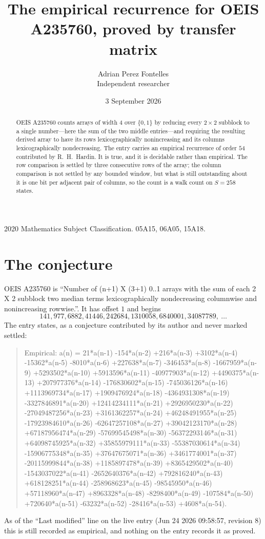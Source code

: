 \documentclass[11pt,a4paper]{article}
\title{The empirical recurrence for OEIS A235760, proved by transfer matrix}
\author{Adrian Perez Fontelles\\ \small Independent researcher}
\date{3 September 2026}
\theoremstyle{plain}
\theoremstyle{definition}
\begin{document}
\maketitle

\begin{abstract}
OEIS A235760 counts arrays of width $4$ over $\{0,1\}$ by reducing every $2\times2$ subblock to a
single number---here the sum of the two middle entries---and requiring the resulting derived array to have its rows
lexicographically nonincreasing and its columns lexicographically nondecreasing. The entry carries an
empirical recurrence of order $54$ contributed by R.~H.~Hardin. It is true, and it is
decidable rather than empirical. The row comparison is settled by three consecutive rows of the
array; the column comparison is not settled by any bounded window, but what is still outstanding
about it is one bit per adjacent pair of columns, so the count is a walk count on $S=258$
states.
\end{abstract}

\noindent\small 2020 Mathematics Subject Classification. 05A15, 06A05, 15A18.\normalsize

\section{The conjecture}

OEIS A235760 is ``Number of (n+1) X (3+1) 0..1 arrays with the sum of each 2 X 2 subblock two median terms lexicographically nondecreasing columnwise and nonincreasing rowwise.''. It has offset $1$ and begins
\[
141, 977, 6882, 41446, 242684, 1310058, 6840001, 34087789,\ \dots
\]
The entry states, as a conjecture contributed by its author and never marked settled:
\begin{quote}
Empirical: a(n) = 21*a(n-1) -154*a(n-2) +216*a(n-3) +3102*a(n-4) -15362*a(n-5) -8010*a(n-6) +227638*a(n-7) -346453*a(n-8) -1667959*a(n-9) +5293502*a(n-10) +5913596*a(n-11) -40977903*a(n-12) +4490375*a(n-13) +207977376*a(n-14) -176830602*a(n-15) -745036126*a(n-16) +1113969734*a(n-17) +1909476924*a(n-18) -4364931308*a(n-19) -3327846891*a(n-20) +12414234111*a(n-21) +2926950230*a(n-22) -27049487256*a(n-23) +3161362257*a(n-24) +46248491955*a(n-25) -17923984610*a(n-26) -62647257108*a(n-27) +39042123170*a(n-28) +67187956474*a(n-29) -57699545498*a(n-30) -56372293146*a(n-31) +64098745925*a(n-32) +35855979111*a(n-33) -55387030614*a(n-34) -15906775348*a(n-35) +37647675071*a(n-36) +3461774001*a(n-37) -20115999844*a(n-38) +1185897478*a(n-39) +8365429502*a(n-40) -1543037022*a(n-41) -2652640376*a(n-42) +792816240*a(n-43) +618128251*a(n-44) -258968623*a(n-45) -98545950*a(n-46) +57118960*a(n-47) +8963328*a(n-48) -8298400*a(n-49) -107584*a(n-50) +720640*a(n-51) -63232*a(n-52) -28416*a(n-53) +4608*a(n-54).
\end{quote}
As of the ``Last modified'' line on the live entry (Jun 24 2026 09:58:57, revision 8) this is still
recorded as empirical, and nothing on the entry records it as proved.
\end{document}
